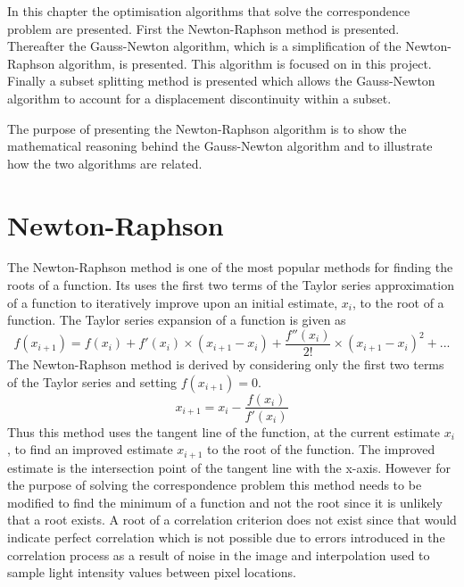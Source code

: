 \documentclass[12pt,oneside,openany,a4paper, %
english, %
masters-t, goldenblock]{usthesis}
\begin{document}
In this chapter the optimisation algorithms that solve the correspondence problem are presented. First the Newton-Raphson method is presented. Thereafter the Gauss-Newton algorithm, which is a simplification of the Newton-Raphson algorithm, is presented. This algorithm is focused on in this project. Finally a subset splitting method is presented which allows the Gauss-Newton algorithm to account for a displacement discontinuity within a subset.

The purpose of presenting the Newton-Raphson algorithm is to show the mathematical reasoning behind the Gauss-Newton algorithm and to illustrate how the two algorithms are related.





\section{Newton-Raphson}
The Newton-Raphson method is one of the most popular methods for finding the roots of a function. Its uses the first two terms of the Taylor series approximation of a function to iteratively improve upon an initial estimate, $x_i$, to the root of a function. The Taylor series expansion of a function is given as
\begin{equation}
  \label{eq: newton raphson taylor}
  f(x_{i+1})=f(x_i)+f'(x_i) \times (x_{i+1}-x_i) + \frac{f''(x_i)}{2!} \times (x_{i+1}-x_i)^2 + ...
\end{equation}
The Newton-Raphson method is derived by considering only the first two terms of the Taylor series and setting $f(x_{i+1})=0$.
\begin{equation}
  \label{eq: newton raphson}
  x_{i+1}=x_i-\frac{f(x_i)}{f'(x_i)}
\end{equation}
Thus this method uses the tangent line of the function, at the current estimate $x_i$, to find an improved estimate $x_{i+1}$ to the root of the function. The improved estimate is the intersection point of the tangent line with the x-axis. However for the purpose of solving the correspondence problem this method needs to be modified to find the minimum of a function and not the root since it is unlikely that a root exists. A root of a correlation criterion does not exist since that would indicate perfect correlation which is not possible due to errors introduced in the correlation process as a result of noise in the image and interpolation used to sample light intensity values between pixel locations. 
\end{document}
